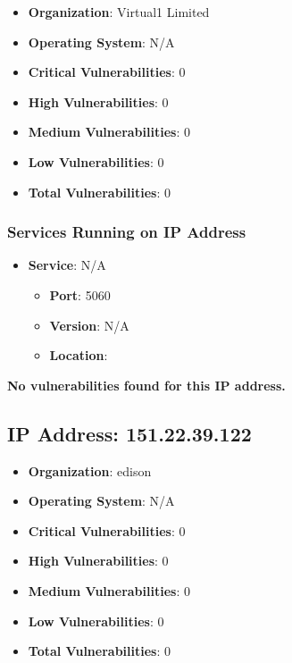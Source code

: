 \documentclass{article}
\begin{document}
\begin{itemize}
    \item \textbf{Organization}: Virtual1 Limited
    \item \textbf{Operating System}:  N/A 
    \item \textbf{Critical Vulnerabilities}: 0
    \item \textbf{High Vulnerabilities}: 0
    \item \textbf{Medium Vulnerabilities}: 0
    \item \textbf{Low Vulnerabilities}: 0
    \item \textbf{Total Vulnerabilities}: 0
\end{itemize}

\subsubsection*{Services Running on IP Address}

\begin{itemize}
    
        \item \textbf{Service}: N/A
        \begin{itemize}
            \item \textbf{Port}: 5060
            \item \textbf{Version}:  N/A 
            \item \textbf{Location}: \href{  }{  }
        \end{itemize}
    
\end{itemize}


\textbf{No vulnerabilities found for this IP address.}




\clearpage



\subsection{IP Address: 151.22.39.122}

\begin{itemize}
    \item \textbf{Organization}: edison
    \item \textbf{Operating System}:  N/A 
    \item \textbf{Critical Vulnerabilities}: 0
    \item \textbf{High Vulnerabilities}: 0
    \item \textbf{Medium Vulnerabilities}: 0
    \item \textbf{Low Vulnerabilities}: 0
    \item \textbf{Total Vulnerabilities}: 0
\end{itemize}
\end{document}
